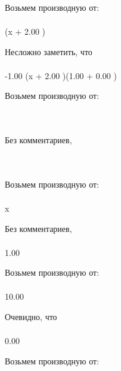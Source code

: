 Возьмем производную от:
\begin{gather}
\end{gather}
\begin{}
\cos (x + 2.00 )\\
\end{}
Несложно заметить, что
\begin{gather}
\end{gather}
\begin{}
-1.00 \cdot \sin (x + 2.00 )\cdot (1.00 + 0.00 )\\
\end{}
Возьмем производную от:
\begin{gather}
\end{gather}
\begin{}
\\
\end{}
Без комментариев, 
\begin{gather}
\end{gather}
\begin{}
\\
\end{}
Возьмем производную от:
\begin{gather}
\end{gather}
\begin{}
x \\
\end{}
Без комментариев, 
\begin{gather}
\end{gather}
\begin{}
1.00 \\
\end{}
Возьмем производную от:
\begin{gather}
\end{gather}
\begin{}
10.00 \\
\end{}
Очевидно, что
\begin{gather}
\end{gather}
\begin{}
0.00 \\
\end{}
Возьмем производную от:
\begin{gather}
\end{gather}
\begin{}
\\
\end{}
